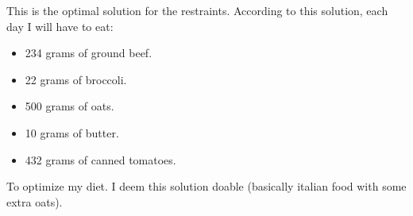 \documentclass[margin=0.3in]{article}
\begin{document}
This is the optimal solution for the restraints. According to this solution, each day I will have to eat:
\begin{itemize}
\item 234 grams of ground beef.
\item 22 grams of broccoli.
\item 500 grams of oats.
\item 10 grams of butter.
\item 432 grams of canned tomatoes.
\end{itemize}

To optimize my diet. I deem this solution doable (basically italian food with some extra oats).
\end{document}
